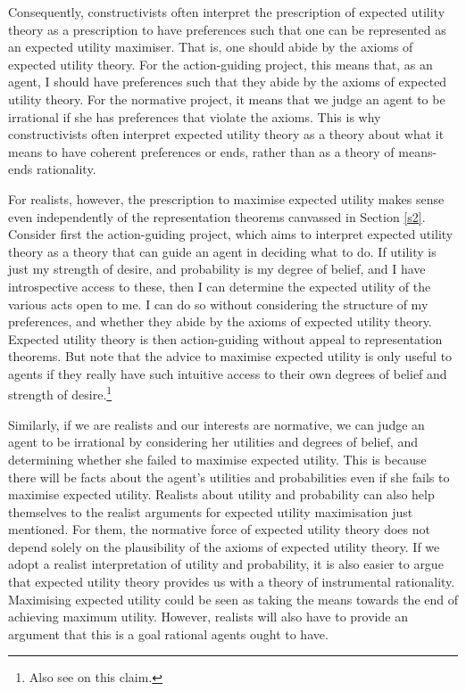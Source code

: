 Consequently, constructivists often interpret the prescription of expected utility theory as a prescription to have preferences such that one can be represented as an expected utility maximiser. That is, one should abide by the axioms of expected utility theory. For the action-guiding project, this means that, as an agent, I should have preferences such that they abide by the axioms of expected utility theory. For the normative project, it means that we judge an agent to be irrational if she has preferences that violate the axioms. This is why constructivists often interpret expected utility theory as a theory about what it means to have coherent preferences or ends, rather than as a theory of means-ends rationality.

For realists, however, the prescription to maximise expected utility makes sense even independently of the representation theorems canvassed in Section \ref{s2}. Consider first the action-guiding project, which aims to interpret expected utility theory as a theory that can guide an agent in deciding what to do. If utility is just my strength of desire, and probability is my degree of belief, and I have introspective access to these, then I can determine the expected utility of the various acts open to me. I can do so without considering the structure of my preferences, and whether they abide by the axioms of expected utility theory. Expected utility theory is then action-guiding without appeal to representation theorems. But note that the advice to maximise expected utility is only useful to agents if they really have such intuitive access to their own degrees of belief and strength of desire.\footnote{Also see \citet{Bermudez2009} on this claim.}

Similarly, if we are realists and our interests are normative, we can judge an agent to be irrational by considering her utilities and degrees of belief, and determining whether she failed to maximise expected utility. This is because there will be facts about the agent's utilities and probabilities even if she fails to maximise expected utility. Realists about utility and probability can also help themselves to the realist arguments for expected utility maximisation just mentioned. For them, the normative force of expected utility theory does not depend solely on the plausibility of the axioms of expected utility theory. If we adopt a realist interpretation of utility and probability, it is also easier to argue that expected utility theory provides us with a theory of instrumental rationality. Maximising expected utility could be seen as taking the means towards the end of achieving maximum utility. However, realists will also have to provide an argument that this is a goal rational agents ought to have.

